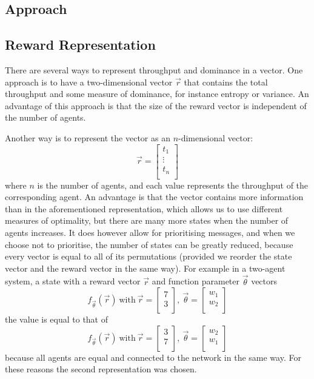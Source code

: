 \documentclass{article}
\begin{document}
\begin{multicols}{2}
	\section{Approach}
	\label{sec:approach}

		\subsection{Reward Representation}
		\label{sub:reward_representation}
		There are several ways to represent throughput and dominance in a vector.
		One approach is to have a two-dimensional vector $\vec{r}$ that contains
		the total throughput and some measure of dominance, for instance entropy
		or variance. An advantage of this approach is that the size of the reward
		vector is independent of the number of agents.

		Another way is to represent the vector as an $n$-dimensional vector:
		$$\vec{r} = \begin{bmatrix}
			t_1\\
			\vdots\\
			t_n\\
		\end{bmatrix}$$
		where $n$ is the number of agents, and each value represents the
		throughput of the corresponding agent. An advantage is that the vector
		contains more information than in the aforementioned representation,
		which allows us to use different measures of optimality, but
		there are many more states when the number of agents increases. It does
		however allow for prioritising messages, and when we choose not to
		prioritise, the number of states can be greatly reduced, because every
		vector is equal to all of its permutations (provided we reorder the state
		vector and the reward vector in the same way).
		For example in a two-agent system, a state with a reward vector $\vec{r}$
		and function parameter $\vec{\theta}$
		vectors
		$$ f_{\vec{\theta}}(\vec{r})~\textrm{with}~\vec{r} = \begin{bmatrix}
			7\\
			3\\
		\end{bmatrix},~
		\vec{\theta} = \begin{bmatrix}
			w_1\\
			w_2\\
		\end{bmatrix}$$
		the value is equal to that of
		$$ f_{\vec{\theta}}(\vec{r})~\textrm{with}~\vec{r} = \begin{bmatrix}
			3\\
			7\\
		\end{bmatrix},~
		\vec{\theta} = \begin{bmatrix}
			w_2\\
			w_1\\
		\end{bmatrix}$$
		because all agents are equal and connected to the network in the same
		way.
		For these reasons the second representation was chosen.


\end{multicols}
\end{document}

